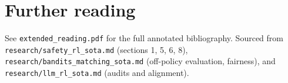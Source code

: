 \documentclass[11pt,oneside]{scrbook}
\begin{document}
\chapter{Further reading}
See \texttt{extended\_reading.pdf} for the full annotated bibliography.
Sourced from \texttt{research/safety\_rl\_sota.md} (sections 1, 5, 6, 8),
\texttt{research/bandits\_matching\_sota.md} (off-policy evaluation,
fairness), and \texttt{research/llm\_rl\_sota.md} (audits and alignment).
\end{document}
